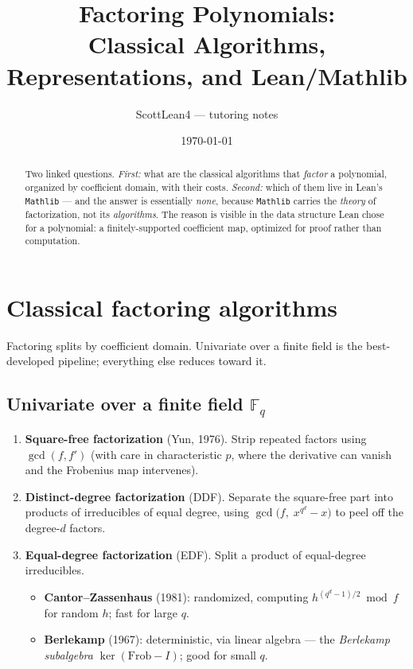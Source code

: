 \documentclass[11pt]{article}
\title{\bfseries Factoring Polynomials:\\
       Classical Algorithms, Representations, and Lean/Mathlib}
\author{ScottLean4 --- tutoring notes}
\date{\today}
\newcommand{\FF}{\mathbb{F}}
\newcommand{\code}[1]{\texttt{#1}}
\begin{document}
\maketitle

\begin{abstract}
Two linked questions. \emph{First:} what are the classical algorithms that
\emph{factor} a polynomial, organized by coefficient domain, with their costs.
\emph{Second:} which of them live in Lean's \code{Mathlib} --- and the answer is
essentially \emph{none}, because \code{Mathlib} carries the \emph{theory} of
factorization, not its \emph{algorithms}. The reason is visible in the data
structure Lean chose for a polynomial: a finitely-supported coefficient map,
optimized for proof rather than computation.
\end{abstract}

\section{Classical factoring algorithms}

Factoring splits by coefficient domain. Univariate over a finite field is the
best-developed pipeline; everything else reduces toward it.

\subsection{Univariate over a finite field $\FF_q$}

\begin{enumerate}[leftmargin=*]
  \item \textbf{Square-free factorization} (Yun, 1976). Strip repeated factors
        using $\gcd(f, f')$ (with care in characteristic $p$, where the
        derivative can vanish and the Frobenius map intervenes).
  \item \textbf{Distinct-degree factorization} (DDF). Separate the square-free
        part into products of irreducibles of equal degree, using
        $\gcd\!\big(f,\; x^{q^{d}} - x\big)$ to peel off the degree-$d$ factors.
  \item \textbf{Equal-degree factorization} (EDF). Split a product of
        equal-degree irreducibles.
        \begin{itemize}[leftmargin=1.4em]
          \item \textbf{Cantor--Zassenhaus} (1981): randomized, computing
                $h^{(q^{d}-1)/2} \bmod f$ for random $h$; fast for large $q$.
          \item \textbf{Berlekamp} (1967): deterministic, via linear algebra ---
                the \emph{Berlekamp subalgebra} $\ker(\mathrm{Frob} - I)$; good
                for small $q$.
        \end{itemize}
\end{enumerate}
\end{document}
